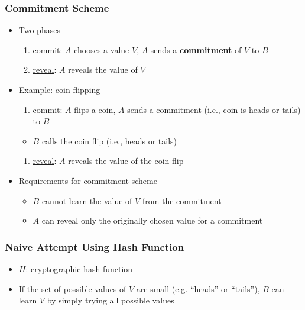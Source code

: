 \documentclass[final]{article}
\begin{document}
\subsubsection*{Commitment Scheme}
\begin{itemize}[nosep]
    \item Two phases
          \begin{enumerate}[nosep]
              \item \underline{commit}: $A$ chooses a value $V$, $A$ sends a \textbf{commitment} of $V$ to $B$
              \item \underline{reveal}: $A$ reveals the value of $V$
          \end{enumerate}
    \item Example: coin flipping
          \begin{enumerate}[nosep]
              \item \underline{commit}: $A$ flips a coin, $A$ sends a commitment (i.e., coin is heads or tails) to $B$
          \end{enumerate}
          \begin{itemize}[nosep]
              \item $B$ calls the coin flip (i.e., heads or tails)
          \end{itemize}
          \begin{enumerate}
              \item \underline{reveal}: $A$ reveals the value of the coin flip
          \end{enumerate}
    \item Requirements for commitment scheme
          \begin{itemize}[nosep]
              \item $B$ cannot learn the value of $V$ from the commitment
              \item $A$ can reveal only the originally chosen value for a commitment
          \end{itemize}
\end{itemize}
\subsubsection*{Naive Attempt Using Hash Function}
\begin{itemize}[nosep]
    \item $H$: cryptographic hash function
    \item If the set of possible values of $V$ are small (e.g. ``heads'' or ``tails''), $B$ can learn $V$ by simply trying all possible values
\end{itemize}
\end{document}
